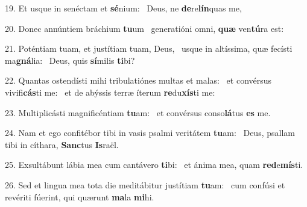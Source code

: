 19. Et usque in senéctam et \textbf{sé}nium: \ast\  Deus, ne \textbf{de}re\textbf{lín}quas me,\

20. Donec annúntiem bráchium \textbf{tu}um \ast\  generatióni omni, \textbf{quæ} ven\textbf{tú}ra est:\

21. Poténtiam tuam, et justítiam tuam, Deus, \dag\  usque in altíssima, quæ fecísti ma\textbf{gná}lia: \ast\  Deus, quis \textbf{sí}milis \textbf{ti}bi?\

22. Quantas ostendísti mihi tribulatiónes multas et malas: \dag\  et convérsus vivifi\textbf{cás}ti me: \ast\  et de abýssis terræ íterum \textbf{re}du\textbf{xís}ti me:\

23. Multiplicásti magnificéntiam \textbf{tu}am: \ast\  et convérsus conso\textbf{lá}tus \textbf{es} me.\

24. Nam et ego confitébor tibi in vasis psalmi veritátem \textbf{tu}am: \ast\  Deus, psallam tibi in cíthara, \textbf{Sanc}tus \textbf{Is}raël.\

25. Exsultábunt lábia mea cum cantávero \textbf{ti}bi: \ast\  et ánima mea, quam \textbf{red}e\textbf{mís}ti.\

26. Sed et lingua mea tota die meditábitur justítiam \textbf{tu}am: \ast\  cum confúsi et revériti fúerint, qui quærunt \textbf{ma}la \textbf{mi}hi.\

